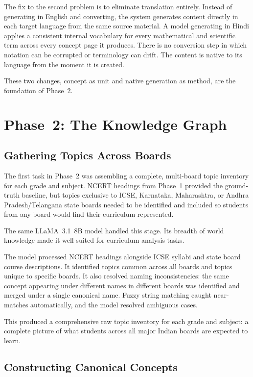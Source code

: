 \documentclass[12pt,a4paper]{article}
\begin{document}
The fix to the second problem is to eliminate translation entirely.
Instead of generating in English and converting, the system generates content
directly in each target language from the same source material.
A model generating in Hindi applies a consistent internal vocabulary for every
mathematical and scientific term across every concept page it produces.
There is no conversion step in which notation can be corrupted or terminology can drift.
The content is native to its language from the moment it is created.

These two changes, concept as unit and native generation as method, are the foundation of Phase~2.

\section{Phase~2: The Knowledge Graph}

\subsection{Gathering Topics Across Boards}

The first task in Phase~2 was assembling a complete, multi-board topic inventory
for each grade and subject.
NCERT headings from Phase~1 provided the ground-truth baseline,
but topics exclusive to ICSE, Karnataka, Maharashtra, or Andhra Pradesh/Telangana
state boards needed to be identified and included so students from any board
would find their curriculum represented.

The same LLaMA~3.1~8B model handled this stage.
Its breadth of world knowledge made it well suited for curriculum analysis tasks.

The model processed NCERT headings alongside ICSE syllabi and state board course descriptions.
It identified topics common across all boards and topics unique to specific boards.
It also resolved naming inconsistencies: the same concept appearing under different names
in different boards was identified and merged under a single canonical name.
Fuzzy string matching caught near-matches automatically,
and the model resolved ambiguous cases.

This produced a comprehensive raw topic inventory for each grade and subject:
a complete picture of what students across all major Indian boards are expected to learn.

\subsection{Constructing Canonical Concepts}
\end{document}

